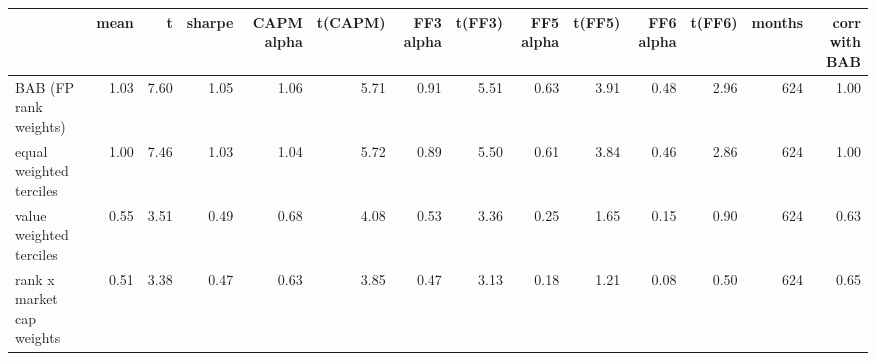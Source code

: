 \begin{tabular}{lrrrrrrrrrrrrr}
\toprule
 & mean & t & sharpe & CAPM alpha & t(CAPM) & FF3 alpha & t(FF3) & FF5 alpha & t(FF5) & FF6 alpha & t(FF6) & months & corr with BAB \\
\midrule
BAB (FP rank weights) & 1.03 & 7.60 & 1.05 & 1.06 & 5.71 & 0.91 & 5.51 & 0.63 & 3.91 & 0.48 & 2.96 & 624 & 1.00 \\
equal weighted terciles & 1.00 & 7.46 & 1.03 & 1.04 & 5.72 & 0.89 & 5.50 & 0.61 & 3.84 & 0.46 & 2.86 & 624 & 1.00 \\
value weighted terciles & 0.55 & 3.51 & 0.49 & 0.68 & 4.08 & 0.53 & 3.36 & 0.25 & 1.65 & 0.15 & 0.90 & 624 & 0.63 \\
rank x market cap weights & 0.51 & 3.38 & 0.47 & 0.63 & 3.85 & 0.47 & 3.13 & 0.18 & 1.21 & 0.08 & 0.50 & 624 & 0.65 \\
\bottomrule
\end{tabular}
